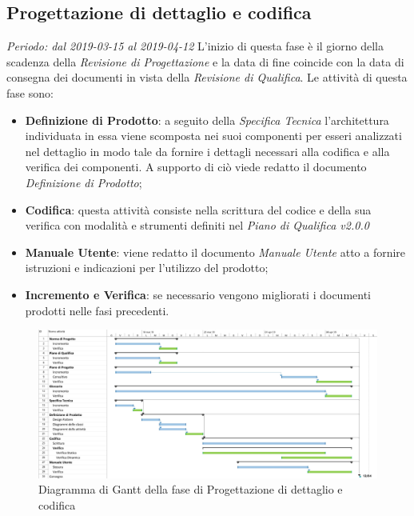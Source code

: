 \subsection{Progettazione di dettaglio e codifica}
\textit{Periodo: dal 2019-03-15 al 2019-04-12}
L'inizio di questa fase è il giorno della scadenza della \textit{Revisione di 
Progettazione} e la data di fine coincide con la data di consegna dei documenti 
in vista della \textit{Revisione di Qualifica}. Le attività di questa fase sono:
\begin{itemize}
	\item \textbf{Definizione di Prodotto}: a seguito della \textit{Specifica 
	Tecnica} l'architettura individuata in essa viene scomposta nei suoi 
	componenti per esseri analizzati nel dettaglio in modo tale da fornire i 
	dettagli necessari alla codifica e alla verifica dei componenti. A supporto 
	di ciò viede redatto il documento \textit{Definizione di Prodotto};
	\item \textbf{Codifica}: questa attività consiste nella scrittura del 
	codice e della sua verifica con modalità e strumenti definiti nel 
	\textit{Piano di Qualifica v2.0.0}
	\item \textbf{Manuale Utente}: viene redatto il documento \textit{Manuale 
	Utente} atto a fornire istruzioni e indicazioni per l'utilizzo del prodotto;
	\item \textbf{Incremento e Verifica}: se necessario vengono migliorati i 
	documenti prodotti nelle fasi precedenti.
\end{itemize}


\begin{figure}[H]
	\includegraphics[width=0.99\linewidth]{res/images/gantt_pd.jpg}
	\caption{Diagramma di Gantt della fase di Progettazione di dettaglio e codifica}
\end{figure}
\pagebreak


